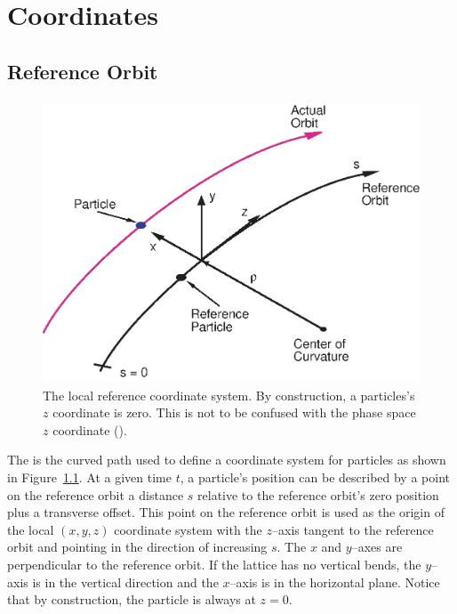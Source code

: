 \chapter{Coordinates}

\section{Reference Orbit}
\label{s:ref}


\begin{figure}[!b]
\centering
\includegraphics[height=8.4cm]{local-coords.eps}
\caption[The Local Reference System.]
{The local reference coordinate system. 
By construction, a particles's $z$ coordinate is zero. 
This is not to be confused with the phase space $z$ coordinate ().}
\label{f:local.coords}
\end{figure}

The  is the curved path used to define a coordinate
system for particles as shown in Figure~\ref{f:local.coords}.  At a
given time $t$, a particle's position can be described by a point on
the reference orbit a distance $s$ relative to the reference orbit's
zero position plus a transverse offset. This point on the reference
orbit is used as the origin of the local $(x, y, z)$ coordinate system
with the $z$--axis tangent to the reference orbit and pointing in the
direction of increasing $s$. The $x$ and $y$--axes are
perpendicular to the reference orbit. If the lattice has no vertical
bends, the $y$--axis is in the vertical direction and the $x$--axis is
in the horizontal plane. Notice that by construction, the particle is
always at $z = 0$.

